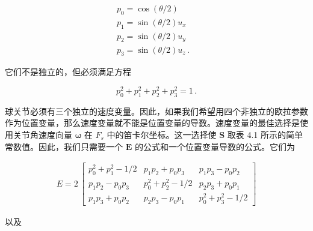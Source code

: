 \documentclass[10pt,a4paper]{book}
\theoremstyle{thmstyle} %
\theoremstyle{defstyle} %
\theoremstyle{prostyle} %
\begin{document}
$$
\begin{array}{rl} { p _ { 0 } = \cos ( \theta / 2 ) } & { } \\ { p _ { 1 } = \sin ( \theta / 2 ) u _ { x } } & { } \\ { p _ { 2 } = \sin ( \theta / 2 ) u _ { y } } & { } \\ { p _ { 3 } = \sin ( \theta / 2 ) u _ { z } \, . } & { } \end{array}
$$



它们不是独立的，但必须满足方程



$$
p _ { 0 } ^{2} + p _ { 1 } ^{2} + p _ { 2 } ^{2} + p _ { 3 } ^{2} = 1 \, .
$$



球关节必须有三个独立的速度变量。因此，如果我们希望用四个非独立的欧拉参数作为位置变量，那么速度变量就不能是位置变量的导数。速度变量的最佳选择是使用关节角速度向量 $\boldsymbol{\omega}$ 在 $F_s$ 中的笛卡尔坐标。这一选择使 $\boldsymbol{S}$ 取表 4.1 所示的简单常数值。因此，我们只需要一个 $\boldsymbol{E}$ 的公式和一个位置变量导数的公式。它们为



$$
\begin{array}{rl} { E = 2 \, \left[ \begin{array}{lll} { p _ { 0 } ^{2} + p _ { 1 } ^{2} - 1 / 2 } & { p _ { 1 } p _ { 2 } + p _ { 0 } p _ { 3 } } & { p _ { 1 } p _ { 3 } - p _ { 0 } p _ { 2 } } \\ { p _ { 1 } p _ { 2 } - p _ { 0 } p _ { 3 } } & { p _ { 0 } ^{2} + p _ { 2 } ^{2} - 1 / 2 } & { p _ { 2 } p _ { 3 } + p _ { 0 } p _ { 1 } } \\ { p _ { 1 } p _ { 3 } + p _ { 0 } p _ { 2 } } & { p _ { 2 } p _ { 3 } - p _ { 0 } p _ { 1 } } & { p _ { 0 } ^{2} + p _ { 3 } ^{2} - 1 / 2 } \end{array} \right] } \end{array}
$$



以及
\end{document}
